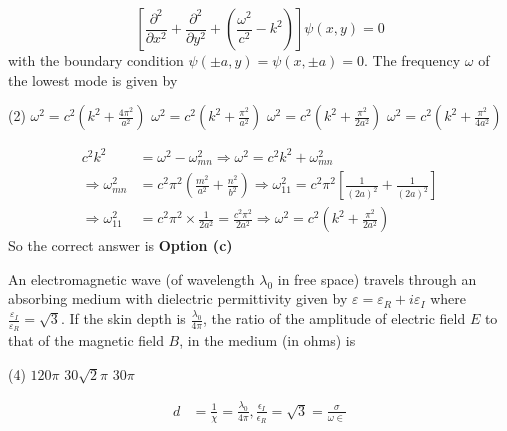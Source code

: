 \begin{enumerate}
\begin{minipage}{\textwidth}
		$$
		\left[\frac{\partial^{2}}{\partial x^{2}}+\frac{\partial^{2}}{\partial y^{2}}+\left(\frac{\omega^{2}}{c^{2}}-k^{2}\right)\right] \psi(x, y)=0
		$$
		with the boundary condition $\psi(\pm a, y)=\psi(x, \pm a)=0$. The frequency $\omega$ of the lowest mode is given by
	\end{minipage}
	\begin{tasks}(2)
		\task[\textbf{a.}] $\omega^{2}=c^{2}\left(k^{2}+\frac{4 \pi^{2}}{a^{2}}\right)$
		\task[\textbf{b.}]$\omega^{2}=c^{2}\left(k^{2}+\frac{\pi^{2}}{a^{2}}\right)$
		\task[\textbf{c.}]$\omega^{2}=c^{2}\left(k^{2}+\frac{\pi^{2}}{2 a^{2}}\right)$
		\task[\textbf{d.}]$\omega^{2}=c^{2}\left(k^{2}+\frac{\pi^{2}}{4 a^{2}}\right)$
	\end{tasks}
\begin{answer}
	\begin{align*}
	c^{2} k^{2}&=\omega^{2}-\omega_{m n}^{2} \Rightarrow \omega^{2}=c^{2} k^{2}+\omega_{m n}^{2}\\
	\Rightarrow \omega_{m n}^{2}&=c^{2} \pi^{2}\left(\frac{m^{2}}{a^{2}}+\frac{n^{2}}{b^{2}}\right) \Rightarrow \omega_{11}^{2}=c^{2} \pi^{2}\left[\frac{1}{(2 a)^{2}}+\frac{1}{(2 a)^{2}}\right]\\
	\Rightarrow \omega_{11}^{2}&=c^{2} \pi^{2} \times \frac{1}{2 a^{2}}=\frac{c^{2} \pi^{2}}{2 a^{2}} \Rightarrow \omega^{2}=c^{2}\left(k^{2}+\frac{\pi^{2}}{2 a^{2}}\right)
	\end{align*}
	So the correct answer is \textbf{Option (c)}
\end{answer}
	\begin{minipage}{\textwidth}
		\item An electromagnetic wave (of wavelength $\lambda_{0}$ in free space) travels through an absorbing medium with dielectric permittivity given by $\varepsilon=\varepsilon_{R}+i \varepsilon_{I}$ where $\frac{\varepsilon_{I}}{\varepsilon_{R}}=\sqrt{3}$. If the skin depth is $\frac{\lambda_{0}}{4 \pi}$, the ratio of the amplitude of electric field $E$ to that of the magnetic field $B$, in the medium (in ohms) is
	\end{minipage}
	\begin{tasks}(4)
		\task[\textbf{a.}] $120 \pi$
		\task[\textbf{c.}]$30 \sqrt{2} \pi$
		\task[\textbf{d.}] $30 \pi$
	\end{tasks}\begin{answer}
	\begin{align*}
	d&=\frac{1}{\chi}=\frac{\lambda_{0}}{4 \pi}, \frac{\epsilon_{I}}{\epsilon_{R}}=\sqrt{3}=\frac{\sigma}{\omega \in}\\

\end{align*}
\end{answer}
\end{enumerate}
